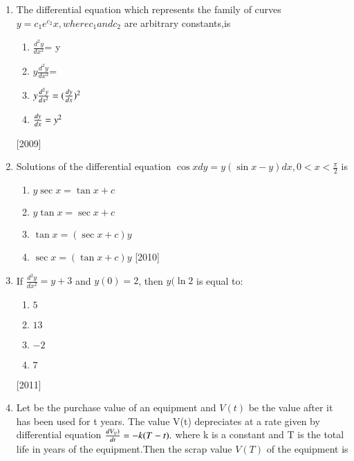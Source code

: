 \documentclass[journal,12pt,twocolumn]{IEEEtran}
\theoremstyle{remark}
\begin{document}
\begin{enumerate}
\item The differential equation which represents the family of curves $y= c{_1}e^{c_2}x , where c{_1} and c{_2}$ are arbitrary constants,is
\begin{enumerate}
    \item $\frac{d^{2}y}{dx^{2}}$= y

    
    \item $y\frac{d^{2}y}{dx^{2}}$= 

    
    \item $y\frac{d^{2}y}{dx^{2}}=(\frac{d{y}}{d{x}})^2$
    
    \item $\frac{d{y}}{d{x}}=y^2$
\end{enumerate}
\hfill
{[2009]}
\item Solutions of the differential equation $\cos{x} d{y}=y(\sin{x}-y)d{x},0<x<\frac{\pi}{2}$ is
\begin{enumerate}

\item $ y\sec{x}=\tan{x}+c$
\item $y\tan{x}=\sec{x}+c$
\item $\tan{x}=(\sec{x}+c)y$
\item $\sec{x}=(\tan{x}+c)y$
\hfill
{{[2010]}}




    
\end{enumerate}

\item If $\frac{d^{2}y}{dx^{2}}=y+3$ and $y(0)=2$, then $y(\ln{2}$ is equal to:
\begin{enumerate}
\item $ 5 $
\item $ 13 $
\item $ -2 $
\item $ 7 $
\end {enumerate}

\hfill
{{[2011]}}



\item Let  be the purchase value of an equipment and $V(t)$ be the value after it has been used for t years. The value V(t) depreciates at a rate given by differential equation $\frac{d{V_{(t})}}{d{t}}=-k(T-t).$ where k is a constant and T is the total life in years of the equipment.Then the scrap value $V(T)$ of the equipment is 

\begin {enumerate}


\end{enumerate}
\end{enumerate}
\end{document}
